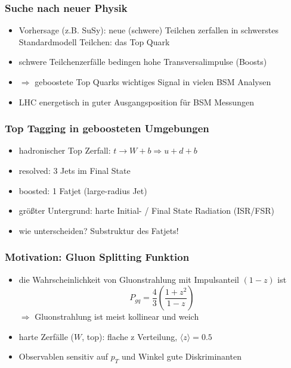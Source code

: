 \documentclass{beamer}
\begin{document}
\begin{frame}
    \frametitle{Suche nach neuer Physik}
    \begin{itemize}
        \item Vorhersage (z.B. SuSy): neue (schwere) Teilchen zerfallen in schwerstes Standardmodell Teilchen: das Top Quark
        \item schwere Teilchenzerfälle bedingen hohe Transversalimpulse (Boosts)
        \item $\Rightarrow$ geboostete Top Quarks wichtiges Signal in vielen BSM Analysen
        \item LHC energetisch in guter Ausgangsposition für BSM Messungen
    \end{itemize}
\end{frame}

\begin{frame}
    \frametitle{Top Tagging in geboosteten Umgebungen}
    \begin{itemize}
        \item hadronischer Top Zerfall: $t \rightarrow W + b \Rightarrow u + d + b$
        \item resolved: 3 Jets im Final State
        \item boosted: 1 Fatjet (large-radius Jet)
        \item größter Untergrund: harte Initial- / Final State Radiation (ISR/FSR)
        \item wie unterscheiden? Substruktur des Fatjets!
    \end{itemize}
\end{frame}




\begin{frame}
    \frametitle{Motivation: Gluon Splitting Funktion}
    \begin{itemize}
        \item die Wahrscheinlichkeit von Gluonstrahlung mit Impulsanteil $(1-z)$ ist
        \begin{equation}
            P_{gq} = \frac 4 3 \left( \frac {1 + z^2} {1 - z} \right)
        \end{equation}
        $\Rightarrow$ Gluonstrahlung ist meist kollinear und weich
        \item harte Zerfälle ($W$, top): flache z Verteilung, $\langle z \rangle = 0.5$
        \item Observablen sensitiv auf $p_T$ und Winkel gute Diskriminanten
    \end{itemize}
\end{frame}
\end{document}
